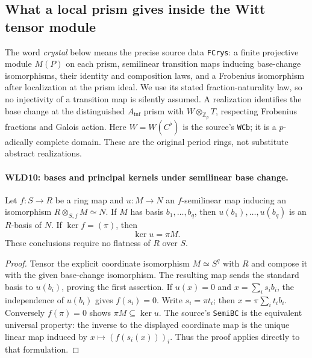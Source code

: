 \subsection{What a local prism gives inside the Witt tensor module}

The word \emph{crystal} below means the precise source data
\texttt{FCrys}: a finite projective module $M(P)$ on each prism,
semilinear transition maps inducing base-change isomorphisms, their
identity and composition laws, and a Frobenius isomorphism after
localization at the prism ideal. We use its stated fraction-naturality
law, so no injectivity of a transition map is silently assumed.
A realization identifies the base change at the distinguished
$A_{\inf}$ prism with $W\otimes_{\mathbb Z_p}T$, respecting Frobenius
fractions and Galois action. Here $W=W(C^\flat)$ is the source's
\texttt{WCb}; it is a $p$-adically complete domain. These are the
original period rings, not substitute abstract realizations.

\paragraph{WLD10: bases and principal kernels under semilinear base change.}
\label{claim:WLD10}
Let $f:S\to R$ be a ring map and $u:M\to N$ an $f$-semilinear map
inducing an isomorphism $R\otimes_{S,f}M\simeq N$. If $M$ has
basis $b_1,\ldots,b_q$, then $u(b_1),\ldots,u(b_q)$ is an
$R$-basis of $N$. If $\ker f=(\pi)$, then
\[
                            \ker u=\pi M.                \tag{WLD.12}
\]
These conclusions require no flatness of $R$ over $S$.

\begin{proof}
Tensor the explicit coordinate isomorphism $M\simeq S^q$ with $R$
and compose it with the given base-change isomorphism.
The resulting map sends the standard basis to $u(b_i)$, proving
the first assertion. If $u(x)=0$ and $x=\sum_i s_ib_i$,
the independence of $u(b_i)$ gives $f(s_i)=0$. Write
$s_i=\pi t_i$; then $x=\pi\sum_i t_ib_i$. Conversely
$f(\pi)=0$ shows $\pi M\subseteq\ker u$.
The source's \texttt{Semi\allowbreak BC} is the equivalent universal property:
the inverse to the displayed coordinate map is the unique linear
map induced by $x\mapsto(f(s_i(x)))_i$. Thus the proof applies
directly to that formulation.
\end{proof}

